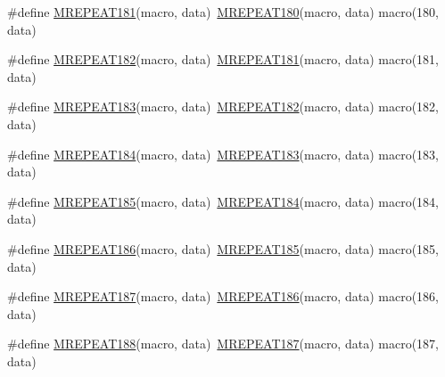 \begin{DoxyCompactItemize}
\item 
\#define \mbox{\hyperlink{group__group__sam0__utils__mrepeat_ga2596ba634c8c3cc9001bdb16a5228933}{M\+R\+E\+P\+E\+A\+T181}}(macro,  data)~\mbox{\hyperlink{group__group__sam0__utils__mrepeat_ga131a0e131d380f253f0748364eb9cc3f}{M\+R\+E\+P\+E\+A\+T180}}(macro, data)   macro(180, data)
\item 
\#define \mbox{\hyperlink{group__group__sam0__utils__mrepeat_ga958c679aab7f419465b7d099d790a944}{M\+R\+E\+P\+E\+A\+T182}}(macro,  data)~\mbox{\hyperlink{group__group__sam0__utils__mrepeat_ga2596ba634c8c3cc9001bdb16a5228933}{M\+R\+E\+P\+E\+A\+T181}}(macro, data)   macro(181, data)
\item 
\#define \mbox{\hyperlink{group__group__sam0__utils__mrepeat_ga413ea4db626945b91fb34b078615b02c}{M\+R\+E\+P\+E\+A\+T183}}(macro,  data)~\mbox{\hyperlink{group__group__sam0__utils__mrepeat_ga958c679aab7f419465b7d099d790a944}{M\+R\+E\+P\+E\+A\+T182}}(macro, data)   macro(182, data)
\item 
\#define \mbox{\hyperlink{group__group__sam0__utils__mrepeat_ga7b8a834a1fbd1d3dcfa95f0d3724835f}{M\+R\+E\+P\+E\+A\+T184}}(macro,  data)~\mbox{\hyperlink{group__group__sam0__utils__mrepeat_ga413ea4db626945b91fb34b078615b02c}{M\+R\+E\+P\+E\+A\+T183}}(macro, data)   macro(183, data)
\item 
\#define \mbox{\hyperlink{group__group__sam0__utils__mrepeat_ga72fd4bb3bee8d7ae45897345c0ca13d1}{M\+R\+E\+P\+E\+A\+T185}}(macro,  data)~\mbox{\hyperlink{group__group__sam0__utils__mrepeat_ga7b8a834a1fbd1d3dcfa95f0d3724835f}{M\+R\+E\+P\+E\+A\+T184}}(macro, data)   macro(184, data)
\item 
\#define \mbox{\hyperlink{group__group__sam0__utils__mrepeat_gaffac3b38c0b0a12816b6620ebd99d6a9}{M\+R\+E\+P\+E\+A\+T186}}(macro,  data)~\mbox{\hyperlink{group__group__sam0__utils__mrepeat_ga72fd4bb3bee8d7ae45897345c0ca13d1}{M\+R\+E\+P\+E\+A\+T185}}(macro, data)   macro(185, data)
\item 
\#define \mbox{\hyperlink{group__group__sam0__utils__mrepeat_ga694587833aed28be3a88e364ef3adbd3}{M\+R\+E\+P\+E\+A\+T187}}(macro,  data)~\mbox{\hyperlink{group__group__sam0__utils__mrepeat_gaffac3b38c0b0a12816b6620ebd99d6a9}{M\+R\+E\+P\+E\+A\+T186}}(macro, data)   macro(186, data)
\item 
\#define \mbox{\hyperlink{group__group__sam0__utils__mrepeat_ga58e111ce05110cc0fe761789c2ec761a}{M\+R\+E\+P\+E\+A\+T188}}(macro,  data)~\mbox{\hyperlink{group__group__sam0__utils__mrepeat_ga694587833aed28be3a88e364ef3adbd3}{M\+R\+E\+P\+E\+A\+T187}}(macro, data)   macro(187, data)

\end{DoxyCompactItemize}

